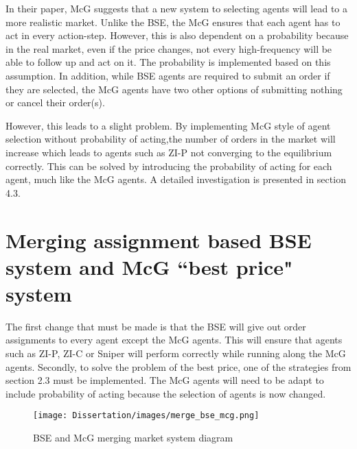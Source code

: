 In their paper, McG suggests that a new system to selecting agents will lead to a more realistic market. Unlike the BSE, the McG ensures that each agent has to act in every action-step. However, this is also dependent on a probability because in the real market, even if the price changes, not every high-frequency will be able to follow up and act on it. The probability is implemented based on this assumption. In addition, while BSE agents are required to submit an order if they are selected, the McG agents have two other options of submitting nothing or cancel their order(s). 

However, this leads to a slight problem. By implementing McG style of agent selection without probability of acting,the number of orders in the market will increase which leads to agents such as ZI-P not converging to the equilibrium correctly. This can be solved by introducing the probability of acting for each agent, much like the McG agents. A detailed investigation is presented in section 4.3. 

\section{Merging assignment based BSE system and McG ``best price" system}
The first change that must be made is that the BSE will give out order assignments to every agent except the McG agents. This will ensure that agents such as ZI-P, ZI-C or Sniper will perform correctly while running along the McG agents. Secondly, to solve the problem of the best price, one of the strategies from section 2.3 must be implemented. The McG agents will need to be adapt to include probability of acting because the selection of agents is now changed. 


\begin{figure}[!htbp]
\caption{BSE and McG merging market system diagram} 
\texttt{[image: Dissertation/images/merge\_bse\_mcg.png]}
\end{figure} 
\FloatBarrier

%  